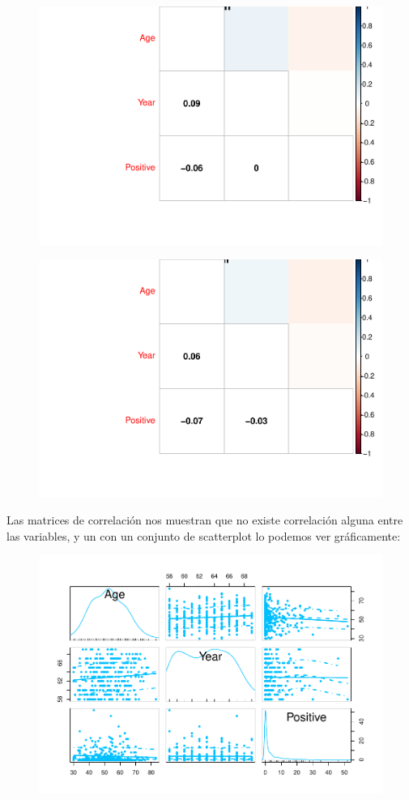 \begin{figure}[H]\includegraphics[width=.9\linewidth]{img/EDA2_files/figure-latex/unnamed-chunk-27-1} \end{figure}

\begin{figure}[H]\includegraphics[width=.9\linewidth]{img/EDA2_files/figure-latex/unnamed-chunk-27-2} \end{figure}

Las matrices de correlación nos muestran que no existe correlación alguna entre las variables, y un con un conjunto de scatterplot lo podemos ver gráficamente:

\begin{figure}[H]\includegraphics[width=.9\linewidth]{img/EDA2_files/figure-latex/unnamed-chunk-28-1} \end{figure}


